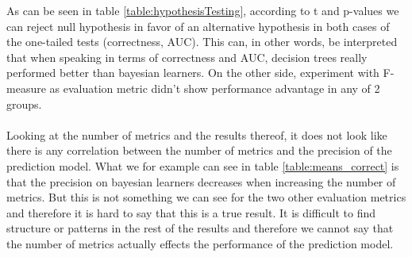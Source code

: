 As can be seen in table \ref{table:hypothesisTesting}, according to t and p-values we can reject null hypothesis in favor of an alternative hypothesis in both cases of the one-tailed tests (correctness, AUC). This can, in other words, be interpreted that when speaking in terms of correctness and AUC, decision trees really performed better than bayesian learners. On the other side, experiment with F-measure as evaluation metric didn't show performance advantage in any of 2 groups.\\\\
Looking at the number of metrics and the results thereof, it does not look like there is any correlation between the number of metrics and the precision of the prediction model. What we for example can see in table \ref{table:means_correct} is that the precision on bayesian learners decreases when increasing the number of metrics. But this is not something we can see for the two other evaluation metrics and therefore it is hard to say that this is a true result. It is difficult to find structure or patterns in the rest of the results and therefore we cannot say that the number of metrics actually effects the performance of the prediction model. 